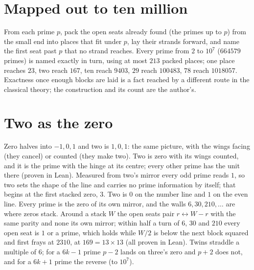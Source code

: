 \documentclass[11pt]{article}
\begin{document}
\section{Mapped out to ten million}
From each prime $p$, pack the open seats already found (the primes up to $p$) from the small end into places that fit under $p$, lay their strands forward, and name the first seat past $p$ that no strand reaches. Every prime from $2$ to $10^7$ ($664579$ primes) is named exactly in turn, using at most $213$ packed places; one place reaches $23$, two reach $167$, ten reach $9403$, $29$ reach $100483$, $78$ reach $1018057$. Exactness once enough blocks are laid is a fact reached by a different route in the classical theory; the construction and its count are the author's.

\section{Two as the zero}
Zero halves into $-1,0,1$ and two is $1,0,1$: the same picture, with the wings facing (they cancel) or counted (they make two). Two is zero with its wings counted, and it is the prime with the hinge at its centre; every other prime has the unit there (proven in Lean). Measured from two's mirror every odd prime reads $1$, so two sets the shape of the line and carries no prime information by itself; that begins at the first stacked zero, $3$. Two is $0$ on the number line and $1$ on the even line. Every prime is the zero of its own mirror, and the walls $6, 30, 210, \dots$ are where zeros stack. Around a stack $W$ the open seats pair $r\leftrightarrow W-r$ with the same parity and none its own mirror; within half a turn of $6$, $30$ and $210$ every open seat is $1$ or a prime, which holds while $W/2$ is below the next block squared and first frays at $2310$, at $169 = 13\times13$ (all proven in Lean). Twins straddle a multiple of $6$; for a $6k-1$ prime $p-2$ lands on three's zero and $p+2$ does not, and for a $6k+1$ prime the reverse (to $10^7$).
\end{document}
